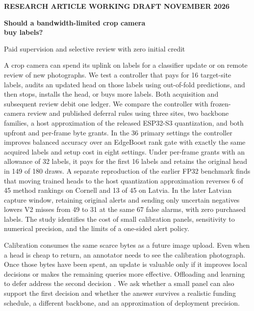 \documentclass[11pt]{article}
\newcommand{\sect}[1]{\vspace{3pt}\noindent{\large\bfseries\color{teal}#1}\par}
\begin{document}
{\footnotesize\color{teal}\bfseries RESEARCH ARTICLE \hfill WORKING DRAFT  NOVEMBER 2026}\par
\vspace{4mm}
{\LARGE\bfseries Should a bandwidth-limited crop camera\\[2pt] buy labels?}\par
{\large\color{ink}Paid supervision and selective review with zero initial credit}\par
\vspace{3mm}
\sect{Abstract}
A crop camera can spend its uplink on labels for a classifier update or on remote review of new photographs. We test a controller that pays for 16 target-site labels, audits an updated head on those labels using out-of-fold predictions, and then stops, installs the head, or buys more labels. Both acquisition and subsequent review debit one ledger. We compare the controller with frozen-camera review and published deferral rules using three sites, two backbone families, a host approximation of the released ESP32-S3 quantization, and both upfront and per-frame byte grants. In the 36 primary settings the controller improves balanced accuracy over an EdgeBoost rank gate with exactly the same acquired labels and setup cost in eight settings. Under per-frame grants with an allowance of 32 labels, it pays for the first 16 labels and retains the original head in 149 of 180 draws. A separate reproduction of the earlier FP32 benchmark finds that moving trained heads to the host quantization approximation reverses 6 of 45 method rankings on Cornell and 13 of 45 on Latvia. In the later Latvian capture window, retaining original alerts and sending only uncertain negatives lowers V2 misses from 49 to 31 at the same 67 false alarms, with zero purchased labels. The study identifies the cost of small calibration panels, sensitivity to numerical precision, and the limits of a one-sided alert policy.

\sect{1 \quad The decision facing the camera}
Calibration consumes the same scarce bytes as a future image upload. Even when a head is cheap to return, an annotator needs to see the calibration photograph. Once those bytes have been spent, an update is valuable only if it improves local decisions or makes the remaining queries more effective. Offloading and learning to defer address the second decision \cite{edgeboost,jit,ova}. We ask whether a small panel can also support the first decision and whether the answer survives a realistic funding schedule, a different backbone, and an approximation of deployment precision.
\end{document}

